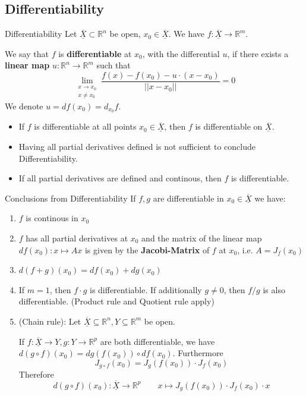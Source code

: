 \documentclass[a4paper,fontsize = 8pt]{scrartcl}
\def\R{\mathbb{R}}
\def\X{\underline{\overline{X}}}
\begin{document}
\subsection{Differentiability}
\begin{mainbox}{Differentiability}
    Let $\X \subset \R^n$ be open, $x_0 \in \X$. We have 
    $f: \X \to \R^m$. 

    We say that $f$ is \textbf{differentiable} at $x_0$, with the differential $u$, if there exists a \textbf{linear map} $u: \R^n \to \R^m$ such that 
    \[\lim_{\substack{x \to x_0 \\ x \neq x_0}} \frac{f(x)-f(x_0)-u\cdot(x-x_0)}{||x-x_0||} = 0\]
    We denote $u = df(x_0) = d_{x_0}f$.
\end{mainbox}
\begin{itemize}
    \item If $f$ is differentiable at all points $x_0 \in \X$, then $f$ is differentiable on $\X$.
    \item Having all partial derivatives defined is not sufficient to conclude Differentiability.
    \item If all partial derivatives are defined and continous, then $f$ is differentiable.
\end{itemize}
\begin{mainbox}{Conclusions from Differentiability}
    If \(f,g\) are differentiable in \(x_0 \in \X\) we have:
    \begin{enumerate}
    \item \(f\) is continous in \(x_0\)
    \item \(f\) has all partial derivatives at \(x_0\) and the matrix of the linear map \(df(x_0): x \mapsto Ax\) is given by the \textbf{Jacobi-Matrix} of \(f\) at \(x_0\), i.e. \(A = J_f(x_0)\)
    \item \(d(f+g)(x_0) = df(x_0) + dg(x_0)\)
    \item If \(m = 1\), then \(f\cdot g\) is differentiable. If additionally \(g \ne 0\), then \(f/g\) is also differentiable. (Product rule and Quotient rule apply)
    \item (Chain rule): Let $\X \subseteq \R^n, Y \subseteq \R^m$ be open. 
    
    If \(f: \X \to Y, g: Y \to \R^p\) are both differentiable, we have \(d(g \circ f)(x_0) = dg(f(x_0)) \circ df(x_0)\). 
    Furthermore \[J_{g \circ f}(x_0) = J_g(f(x_0)) \cdot J_f(x_0)\]
    Therefore \[d(g \circ f)(x_0): \X \to \R^p \qquad x \mapsto J_g(f(x_0)) \cdot J_f(x_0) \cdot x\]
    \end{enumerate}
\end{mainbox}
\end{document}
